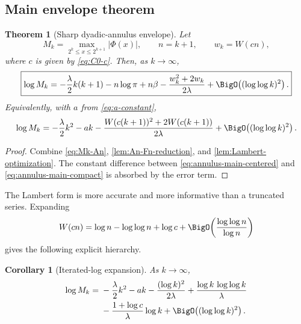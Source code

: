 \documentclass[11pt,oneside]{article}
\newtheorem{theorem}{Theorem}[section]
\newtheorem{corollary}[corollary]{Corollary}
\theoremstyle{definition}
\theoremstyle{remark}
\newcommand{\PhiF}{\Phi}
\begin{document}
\subsection{Main envelope theorem}

\begin{theorem}[Sharp dyadic-annulus envelope]
\label{thm:annulus-main}
Let
\[
 M_k=\max_{2^k\le x\le2^{k+1}}|\PhiF(x)|,
 \qquad n=k+1,
 \qquad w_k=W(cn),
\]
where \(c\) is given by \eqref{eq:C0-c}.  Then, as \(k\to\infty\),
\begin{equation}
\boxed{
 \log M_k=
 -\frac{\lambda}{2}k(k+1)-n\log\pi+n\beta
 -\frac{w_k^2+2w_k}{2\lambda}
 +\BigO\!\left((\log\log k)^2\right).}
 \label{eq:annulus-main-centered}
\end{equation}
Equivalently, with \(a\) from \eqref{eq:a-constant},
\begin{equation}
 \log M_k=
 -\frac\lambda2k^2-ak
 -\frac{W(c(k+1))^2+2W(c(k+1))}{2\lambda}
 +\BigO\!\left((\log\log k)^2\right).
 \label{eq:annulus-main-compact}
\end{equation}
\end{theorem}

\begin{proof}
Combine \eqref{eq:Mk-An}, \cref{lem:An-Fn-reduction}, and
\cref{lem:Lambert-optimization}.  The constant difference between
\eqref{eq:annulus-main-centered} and \eqref{eq:annulus-main-compact} is
absorbed by the error term.
\end{proof}

The Lambert form is more accurate and more informative than a truncated
series.  Expanding
\begin{equation}
 W(cn)=\log n-\log\log n+\log c
 +\BigO\!\left(\frac{\log\log n}{\log n}\right)
 \label{eq:W-expansion}
\end{equation}
gives the following explicit hierarchy.

\begin{corollary}[Iterated-log expansion]
\label{cor:annulus-expanded}
As \(k\to\infty\),
\begin{equation}
\begin{split}
 \log M_k={}&-\frac\lambda2k^2-ak
 -\frac{(\log k)^2}{2\lambda}
 +\frac{\log k\,\log\log k}{\lambda}\\
 &-\frac{1+\log c}{\lambda}\log k
 +\BigO\!\left((\log\log k)^2\right).
\end{split}
\label{eq:annulus-expanded-k}
\end{equation}
\end{corollary}
\end{document}
